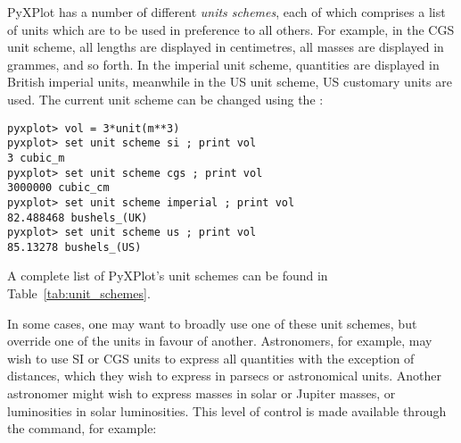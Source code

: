PyXPlot has a number of different {\it units schemes}, each of which comprises a list of units which are to be used in
preference to all others. For example, in the CGS unit scheme, all lengths are displayed in centimetres, all masses
are displayed in grammes, and so forth. In the imperial unit
scheme, quantities are displayed in
British imperial units, meanwhile in the US unit scheme, US customary units are
used. The current unit scheme can be changed using the :

\begin{verbatim}
pyxplot> vol = 3*unit(m**3)
pyxplot> set unit scheme si ; print vol
3 cubic_m
pyxplot> set unit scheme cgs ; print vol
3000000 cubic_cm
pyxplot> set unit scheme imperial ; print vol
82.488468 bushels_(UK)
pyxplot> set unit scheme us ; print vol
85.13278 bushels_(US)
\end{verbatim}

\noindent A complete list of PyXPlot's unit schemes can be found in
Table~\ref{tab:unit_schemes}.

\begin{table}
\caption{A list of PyXPlot's unit schemes.}
\label{tab:unit_schemes}
\end{table}

In some cases, one may want to broadly use one of these unit schemes, but
override one of the units in favour of another.  Astronomers, for example, may
wish to use SI or CGS units to express all quantities with the exception of
distances, which they wish to express in parsecs or astronomical units. Another
astronomer might wish to express masses in solar or Jupiter masses, or
luminosities in solar luminosities. This level of control is made available
through the  command, for example:

